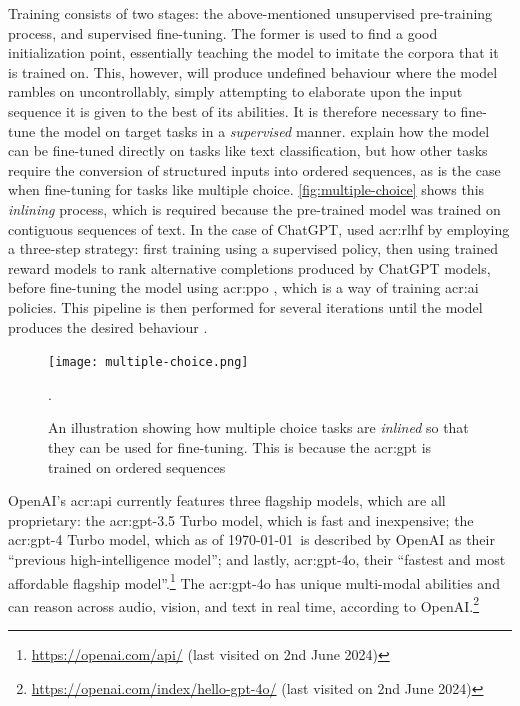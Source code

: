 Training consists of two stages: the above-mentioned unsupervised pre-training process, and supervised fine-tuning. The former is used to find a good initialization point, essentially teaching the model to imitate the corpora that it is trained on. This, however, will produce undefined behaviour where the model rambles on uncontrollably, simply attempting to elaborate upon the input sequence it is given to the best of its abilities. It is therefore necessary to fine-tune the model on target tasks in a \textit{supervised} manner. \cite[4]{radfordImprovingLanguageUnderstanding2018} explain how the model can be fine-tuned directly on tasks like text classification, but how other tasks require the conversion of structured inputs into ordered sequences, as is the case when fine-tuning for tasks like multiple choice. \autoref{fig:multiple-choice} shows this \textit{inlining} process, which is required because the pre-trained model was trained on contiguous sequences of text. In the case of ChatGPT, \citeauthor{openaiIntroducingChatGPT2022} used \gls{acr:rlhf} \citep{christianoDeepReinforcementLearning2023} by employing a three-step strategy: first training using a supervised policy, then using trained reward models to rank alternative completions produced by ChatGPT models, before fine-tuning the model using \gls{acr:ppo} \citep{schulmanProximalPolicyOptimization2017}, which is a way of training \acrshort{acr:ai} policies. This pipeline is then performed for several iterations until the model produces the desired behaviour \citep{openaiIntroducingChatGPT2022}.

\begin{figure}
    \centering
    \texttt{[image: multiple-choice.png]}
    \caption[Inlining of a multiple choice task for GPT fine-tuning]{An illustration showing how multiple choice tasks are \textit{inlined} so that they can be used for fine-tuning. This is because the \acrshort{acr:gpt} is trained on ordered sequences \citep[4]{radfordImprovingLanguageUnderstanding2018}}.
    \label{fig:multiple-choice}
\end{figure}

OpenAI's \acrshort{acr:api} currently features three flagship models, which are all proprietary: the \acrshort{acr:gpt}-3.5 Turbo model, which is fast and inexpensive; the \acrshort{acr:gpt}-4 Turbo model, which as of \today~is described by OpenAI as their \enquote{previous high-intelligence model}; and lastly, \acrshort{acr:gpt}-4o, their \enquote{fastest and most affordable flagship model}.\footnote{\url{https://openai.com/api/} (last visited on 2nd June 2024)} The \acrshort{acr:gpt}-4o has unique multi-modal abilities and can reason across audio, vision, and text in real time, according to OpenAI.\footnote{\url{https://openai.com/index/hello-gpt-4o/} (last visited on 2nd June 2024)}

